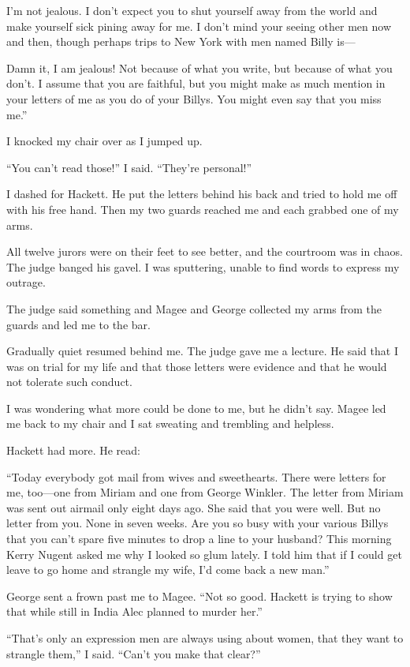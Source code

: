 \documentclass{novel}
\begin{document}
I’m not jealous. I don’t expect you to shut yourself away from the world and make yourself sick pining away for me. I don’t mind your seeing other men now and then, though perhaps trips to New York with men named Billy is—

Damn it, I am jealous! Not because of what you write, but because of what you don’t. I assume that you are faithful, but you might make as much mention in your letters of me as you do of your Billys. You might even say that you miss me.”

I knocked my chair over as I jumped up. 

“You can’t read those!” I said. “They’re personal!”

I dashed for Hackett. He put the letters behind his back and tried to hold me off with his free hand. Then my two guards reached me and each grabbed one of my arms.

All twelve jurors were on their feet to see better, and the courtroom was in chaos. The judge banged his gavel. I was sputtering, unable to find words to express my outrage.

\scenestars

The judge said something and Magee and George collected my arms from the guards and led me to the bar.

Gradually quiet resumed behind me. The judge gave me a lecture. He said that I was on trial for my life and that those letters were evidence and that he would not tolerate such conduct. 

I was wondering what more could be done to me, but he didn’t say. Magee led me back to my chair and I sat sweating and trembling and helpless.

Hackett had more. He read:

“Today everybody got mail from wives and sweethearts. There were letters for me, too—one from Miriam and one from George Winkler. The letter from Miriam was sent out airmail only eight days ago. She said that you were well. But no letter from you. None in seven weeks. Are you so busy with your various Billys that you can’t spare five minutes to drop a line to your husband? This morning Kerry Nugent asked me why I looked so glum lately. I told him that if I could get leave to go home and strangle my wife, I’d come back a new man.”

George sent a frown past me to Magee. “Not so good. Hackett is trying to show that while still in India Alec planned to murder her.”

“That’s only an expression men are always using about women, that they want to strangle them,” I said. “Can’t you make that clear?”
\end{document}
